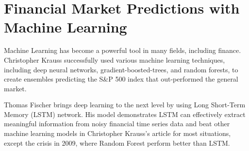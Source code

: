 \section{Financial Market Predictions with Machine Learning}
Machine Learning has become a powerful tool in many fields, including finance. Christopher Krauss successfully used various machine learning techniques, including deep neural networks, gradient-boosted-trees, and random forests, to create ensembles predicting the S\&P 500 index that out-performed the general market\cite{KRAUSS2017689}.
\par

Thomas Fischer brings deep learning to the next level by using Long Short-Term Memory (LSTM) network\cite{FISCHER2018654}. His model demonstrates LSTM can effectively extract meaningful information from noisy financial time series data and beat other machine learning models in  Christopher Krauss's article  \cite{KRAUSS2017689} for most situations, except the crisis in 2009, where Random Forest perform better than LSTM.